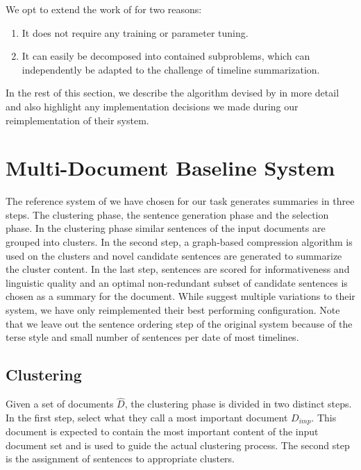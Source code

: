 \documentclass[a4paper,BCOR=10mm]{report}
\numberwithin{lemma}{chapter}
\numberwithin{definition}{chapter}
\begin{document}
We opt to extend the work of \citep{banerjee} for two reasons:

\begin{enumerate}
\item{It does not require any training or parameter tuning.}
\item{It can easily be decomposed into contained subproblems, which can independently be adapted to the challenge of timeline summarization.}
\end{enumerate}

In the rest of this section, we describe the algorithm devised by \citet{banerjee} in more detail and also highlight any implementation decisions we made during our reimplementation of their system.

\section{Multi-Document Baseline System} \label{sec:mds-baseline}

The reference system of \citet{banerjee} we have chosen for our task generates summaries in three steps. The clustering phase, the sentence generation phase and the selection phase. In the clustering phase similar sentences of the input documents are grouped into clusters. In the second step, a graph-based compression algorithm is used on the clusters and novel candidate sentences are generated to summarize the cluster content. In the last step, sentences are scored for informativeness and linguistic quality and an optimal non-redundant subset of candidate sentences is chosen as a summary for the document.
While \citeauthor{banerjee} suggest multiple variations to their system, we have only reimplemented their best performing configuration. Note that we leave out the sentence ordering step of the original system because of the terse style and small number of sentences per date of most timelines.

\subsection{Clustering}  \label{sec:baseline-clustering}

Given a set of documents $\widehat{D}$, the clustering phase is divided in two distinct steps. In the first step, \citeauthor{banerjee} select what they call a most important document $D_{imp}$. This document is expected to contain the most important content of the input document set and is used to guide the actual clustering process. The second step is the assignment of sentences to appropriate clusters.
\end{document}

